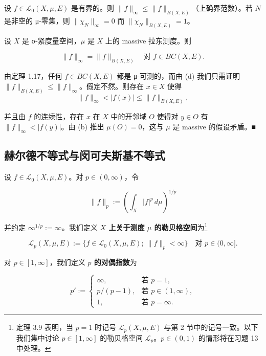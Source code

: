 \begin{remark}
\begin{items}
\item

设 $ f \in \mathcal{L}_0(X,\mu,E) $ 是有界的。则 $ \|f\|_\infty \le \|f\|_{B(X,E)} $（上确界范数）。若 $ N $ 是非空的 μ-零集，则 $ \|\chi_N\|_\infty = 0 $ 而 $ \|\chi_N\|_{B(X,E)} = 1 $。

\item

设 $ X $ 是 σ-紧度量空间，$ \mu $ 是 $ X $ 上的 massive 拉东测度。则

\[
\|f\|_\infty = \|f\|_{B(X,E)} \quad \text{对 } f \in BC(X,E) .
\]

\proofhead
由定理 1.17，任何 $ f \in BC(X,E) $ 都是 μ-可测的，而由 (d) 我们只需证明 $ \|f\|_{B(X,E)} \le \|f\|_\infty $。假定不然。则存在 $ x \in X $ 使得
\[
\|f\|_\infty < |f(x)| \le \|f\|_{B(X,E)} ,
\]

并且由 $ f $ 的连续性，存在 $ x $ 在 $ X $ 中的开邻域 $ O $ 使得对 $ y \in O $ 有 $ \|f\|_\infty < |f(y)| $。由 (b) 推出 $ \mu(O) = 0 $，这与 $ \mu $ 是 massive 的假设矛盾。\nobreak\hspace{0.35em}■

\end{items}

\end{remark}

\subsection*{赫尔德不等式与闵可夫斯基不等式}

设 $ f \in \mathcal{L}_0(X,\mu,E) $。对 $ p \in (0,\infty) $，令

\[
\|f\|_p := \left(\int_X |f|^p\,d\mu\right)^{1/p}
\]

并约定 $ \infty^{1/p} := \infty $。我们定义 \textbf{$ X $ 上关于测度 $ \mu $ 的勒贝格空间}为\footnote{定理 3.9 表明，当 $ p = 1 $ 时记号 $ \mathcal{L}_p(X,\mu,E) $ 与第 2 节中的记号一致。以下我们集中讨论 $ p \in [1,\infty] $ 的勒贝格空间 $ \mathcal{L}_p $。$ p \in (0,1) $ 的情形将在习题 13 中处理。}

\[
\mathcal{L}_p(X,\mu,E) := \{f \in \mathcal{L}_0(X,\mu,E) ;\ \|f\|_p < \infty\} \quad \text{对 } p \in (0,\infty] .
\]

对 $ p \in [1,\infty] $，我们定义 \textbf{$ p $ 的对偶指数}为

\begin{equation*}
p' := \begin{cases} \infty, & \text{若 } p = 1, \\ p/(p-1), & \text{若 } p \in (1,\infty), \\ 1, & \text{若 } p = \infty. \end{cases}
\end{equation*}

